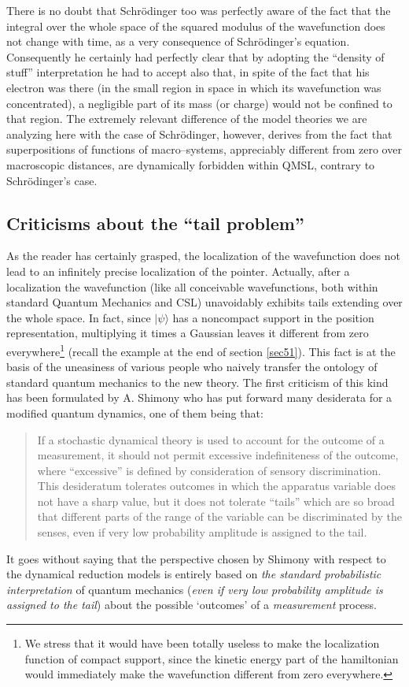 \documentclass[10pt,a4paper]{article}
\begin{document}
There is no doubt that Schr\"{o}dinger too was perfectly aware of
the fact that the integral over the whole space of the squared
modulus of the wavefunction does not change with time, as a very
consequence of Schr\"{o}dinger's equation. Consequently he
certainly had perfectly clear that by adopting the ``density of
stuff'' interpretation he had to accept also that, in spite of the
fact that his electron was there (in the small region in space in
which its wavefunction was concentrated), a negligible part of its
mass (or charge) would not be confined to that region. The
extremely relevant difference of the model theories we are
analyzing here with the case of Schr\"odinger, however, derives
from the fact that superpositions of functions of macro--systems,
appreciably different from zero over macroscopic distances, are
dynamically forbidden within QMSL, contrary to Schr\"odinger's
case.


\subsection{Criticisms about the ``tail problem''} \label{sec132}

As the reader has certainly grasped, the localization of the
wavefunction does not lead to an infinitely precise localization
of the pointer. Actually, after a localization the wavefunction
(like all conceivable wavefunctions, both within standard Quantum
Mechanics and CSL) unavoidably exhibits tails extending over the
whole space. In fact, since $|\psi\rangle$ has a noncompact
support in the position representation, multiplying it times a
Gaussian leaves it different from zero everywhere\footnote{We
stress that it would have been totally useless to make the
localization function of compact support, since the kinetic energy
part of the hamiltonian would immediately make the wavefunction
different from zero everywhere.} (recall the example at the end of
section \ref{sec51}). This fact is at the basis of the uneasiness
of various people who naively transfer the ontology of standard
quantum mechanics to the new theory. The first criticism of this
kind has been formulated by A. Shimony \cite{shi90} who has put
forward many desiderata for a modified quantum dynamics, one of
them being that:
\begin{quotation}
If a stochastic dynamical theory is used to account for the
outcome of a measurement, it should not permit excessive
indefiniteness of the outcome, where ``excessive'' is defined by
consideration of sensory discrimination. This desideratum
tolerates outcomes in which the apparatus variable does not have a
sharp value, but it does not tolerate ``tails'' which are so broad
that different parts of the range of the variable can be
discriminated by the senses, even if very low probability
amplitude is assigned to the tail.
\end{quotation}
It goes without saying that the perspective chosen by Shimony with
respect to the dynamical reduction models is entirely based on
{\it the standard probabilistic interpretation} of quantum
mechanics ({\it even if very low probability amplitude is assigned
to the tail}) about the possible `outcomes' of a {\it measurement}
process.
\end{document}
